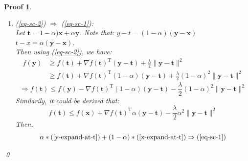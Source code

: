 \documentclass[a4paper,UTF8]{article}
\numberwithin{equation}{section}
\newtheorem*{myProof}{Proof}
\begin{document}
\begin{myProof}
\begin{enumerate}[(1)]
\item (\ref{eq-sc-2}) $\Rightarrow$ (\ref{eq-sc-1}): \\
Let $\mathbf{t}=1-\alpha) \mathbf{x} + \alpha \mathbf{y}$. Note that: $y-t=(1-\alpha) (\mathbf{y}-\mathbf{x})$  $t-x=\alpha (\mathbf{y}-\mathbf{x})$.\\
 Then using (\ref{eq-sc-2}), we have:
\begin{equation*}
\begin{split}
  f(\mathbf{y}) &\geq f(\mathbf{t}) + \nabla f(\mathbf{t})^\mathrm{T}(\mathbf{y}-\mathbf{t}) + \frac{\lambda}{2}\lVert \mathbf{y} - \mathbf{t}\rVert^2 \\
  &\geq f(\mathbf{t}) + \nabla f(\mathbf{t})^\mathrm{T}(1-
 \alpha) (\mathbf{y}-\mathbf{t}) + \frac{\lambda}{2}(1-\alpha)^2\lVert \mathbf{y} - \mathbf{t}\rVert^2
 \end{split}
\end{equation*}
\begin{equation}\label{y-expand-at-t}
 \Rightarrow f(\mathbf{t})  \leq f(\mathbf{y}) - \nabla f(\mathbf{t})^\mathrm{T}(1-
 \alpha) (\mathbf{y}-\mathbf{t}) - \frac{\lambda}{2}(1-\alpha)^2\lVert \mathbf{y} - \mathbf{t}\rVert^2
 \end{equation}
Similarily, it could be derived that:
\begin{equation}\label{x-expand-at-t}
f(\mathbf{t})\leq f(\mathbf{x}) + \nabla f(\mathbf{t})^\mathrm{T}
 \alpha (\mathbf{y}-\mathbf{t}) - \frac{\lambda}{2}\alpha^2\lVert \mathbf{y} - \mathbf{t}\rVert^2
 \end{equation}
Then, 
\begin{equation*}
\alpha*(\ref{y-expand-at-t}) + (1-\alpha) * (\ref{x-expand-at-t}) \Rightarrow (\ref{eq-sc-1})
\end{equation*}

\end{enumerate}
\qed
\end{myProof}


\newpage
\end{document}

